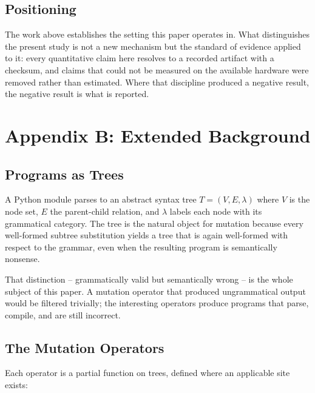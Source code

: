 \documentclass[10pt,twocolumn,letterpaper]{article}
\begin{document}
\subsection{Positioning}


The work above establishes the setting this paper operates in. What distinguishes the present study is not a new mechanism but the standard of evidence applied to it: every quantitative claim here resolves to a recorded artifact with a checksum, and claims that could not be measured on the available hardware were removed rather than estimated. Where that discipline produced a negative result, the negative result is what is reported.




\section{Appendix B: Extended Background}



\subsection{Programs as Trees}


A Python module parses to an abstract syntax tree $T = (V, E, \lambda)$ where $V$ is the node set, $E$ the parent-child relation, and $\lambda$ labels each node with its grammatical category. The tree is the natural object for mutation because every well-formed subtree substitution yields a tree that is again well-formed with respect to the grammar, even when the resulting program is semantically nonsense.

That distinction -- grammatically valid but semantically wrong -- is the whole subject of this paper. A mutation operator that produced ungrammatical output would be filtered trivially; the interesting operators produce programs that parse, compile, and are still incorrect.


\subsection{The Mutation Operators}


Each operator is a partial function on trees, defined where an applicable site exists:
\end{document}
